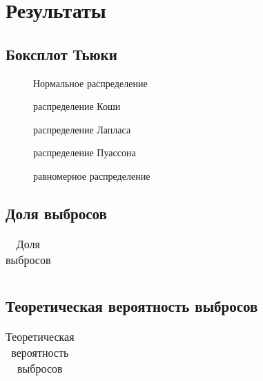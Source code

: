 \documentclass[a4paper]{article}
\begin{document}
\section {Результаты}
\subsection{Боксплот Тьюки}
\begin{figure}[H]
\label{fig:normal}
\caption{Нормальное распределение}
\end{figure}

\begin{figure}[H]
\label{fig:cauchy}
\caption{распределение Коши}
\end{figure}

\begin{figure}[H]
\label{fig:laplace}
\caption{распределение Лапласа}
\end{figure}

\begin{figure}[H]
\label{fig:poisson}
\caption{распределение Пуассона}
\end{figure}

\begin{figure}[H]
\label{fig:uniform}
\caption{равномерное распределение}
\end{figure}

\subsection{Доля выбросов}
\begin{table}[H]
            \centering
            \begin{tabular}{|c|c|c|}
                \hline
                
            \end{tabular}
            \caption{Доля выбросов}
            \label{tab:experimental_anomaly}
            \end{table}


\subsection{Теоретическая вероятность выбросов}
\begin{table}[H]
            \centering
            \begin{tabular}{|c|c|c|c|c|c|}
                \hline
                
            \end{tabular}
            \caption{Теоретическая вероятность выбросов}
            \label{tab:theoretical_anomaly}
            \end{table}
\end{document}
